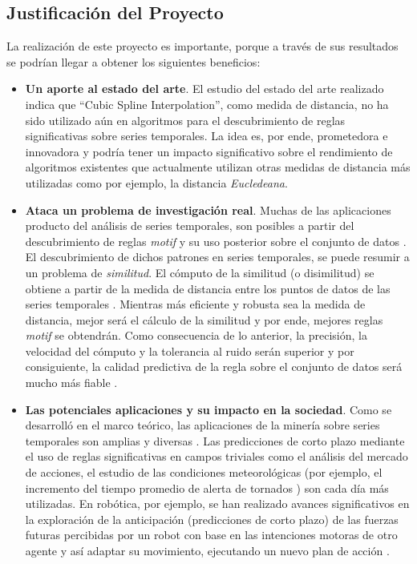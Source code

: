 \subsection{Justificaci\'on del Proyecto}
La realizaci\'on de este proyecto es importante, porque a trav\'es de sus resultados se podr\'ian llegar a obtener los siguientes beneficios:
\begin{itemize}
\item {\textbf{\textbf{Un aporte al estado del arte}}. El estudio del estado del arte realizado indica que \enquote{Cubic Spline Interpolation}, como medida de distancia, no ha sido utilizado a\'un en algoritmos para el descubrimiento de reglas significativas sobre series temporales. La idea es, por ende, prometedora e innovadora y podr\'ia tener un impacto significativo sobre el rendimiento de algoritmos existentes que actualmente utilizan otras medidas de distancia m\'as utilizadas como por ejemplo, la distancia \textit{Eucledeana}.}
\item {\textbf{Ataca un problema de investigaci\'on real}. Muchas de las aplicaciones producto del an\'alisis de series temporales, son posibles a partir del descubrimiento de reglas \textit{motif} y su uso posterior sobre el conjunto de datos \cite{main}. El descubrimiento de dichos patrones en series temporales, se puede resumir a un problema de \textit{similitud}. El c\'omputo de la similitud (o disimilitud) se obtiene a partir de la medida de distancia entre los puntos de datos de las series temporales \cite{main}. Mientras m\'as eficiente y robusta sea la medida de distancia, mejor ser\'a el c\'alculo de la similitud y por ende, mejores reglas \textit{motif} se obtendr\'an. Como consecuencia de lo anterior, la precisi\'on, la velocidad del c\'omputo y la tolerancia al ruido ser\'an superior y por consiguiente, la calidad predictiva de la regla sobre el conjunto de datos ser\'a mucho m\'as fiable \cite{measurements}.}
\item {\textbf{Las potenciales aplicaciones y su impacto en la sociedad}. Como se desarroll\'o en el marco te\'orico, las aplicaciones de la miner\'ia sobre series temporales son amplias y diversas  \cite{main}. Las predicciones de corto plazo mediante el uso de reglas significativas en campos triviales como el an\'alisis del mercado de accio\-nes, el estudio de las condiciones meteorol\'ogicas (por ejemplo, el incremento del tiempo promedio de alerta de tornados \cite{weatherforcasting}) son cada d\'ia m\'as utilizadas. En rob\'otica, por ejemplo, se han realizado avances significativos en la exploraci\'on de la anticipaci\'on (predicciones de corto plazo) de las fuerzas futuras percibidas por un robot con base en las intenciones motoras de otro agente y as\'i adaptar su movimiento, ejecutando un nuevo plan de acci\'on \cite{robotics}.}
\end{itemize}